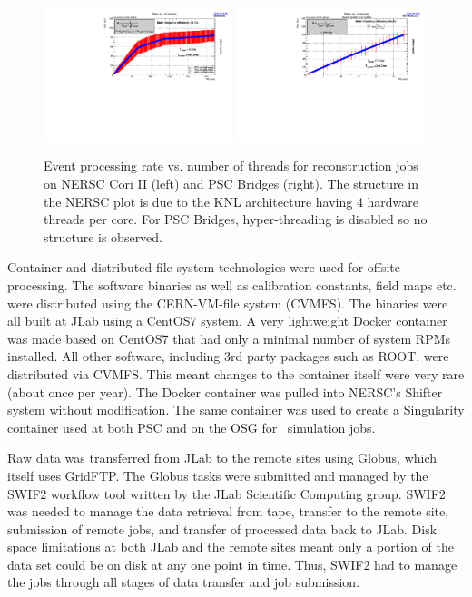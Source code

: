 \begin{figure}[h!]\centering
\includegraphics[width=0.49\textwidth]{figures/production_offsite_rate_vs_nthreads_NERSC.pdf}
\includegraphics[width=0.49\textwidth]{figures/production_offsite_rate_vs_nthreads_PSC.pdf}
\caption[]{\label{fig:production_offsite_rate_vs_nthreads_NERSC}Event processing rate vs. number of threads for reconstruction jobs on NERSC Cori II (left) and PSC Bridges (right). The structure in the NERSC plot is due to the KNL architecture having 4 hardware threads per core. For PSC Bridges, hyper-threading is disabled so no structure is observed.} 
\end{figure}

Container and distributed file system technologies were used for offsite processing. The software binaries as well as calibration constants, field maps etc. were distributed using the CERN-VM-file system (CVMFS). The binaries were all built at JLab using a CentOS7 system. A very lightweight Docker container was made based on CentOS7 that had only a minimal number of system RPMs installed. All other software, including 3rd party packages such as ROOT, were distributed via CVMFS. This meant changes to the container itself were very rare (about once per year). The Docker container was pulled into NERSC's Shifter system without modification. The same container was used to create a Singularity container used at both PSC and on the OSG for \GX~simulation jobs.

Raw data was transferred from JLab to the remote sites using Globus,  which itself uses GridFTP. The Globus tasks were submitted and managed by the SWIF2 workflow tool written by the JLab Scientific Computing group. SWIF2 was needed to manage the data retrieval from tape, transfer to the remote site, submission of remote jobs, and transfer of processed data back to JLab. Disk space limitations at both JLab and the remote sites meant only a portion of the data set could be on disk at any one point in time. Thus, SWIF2 had to manage the jobs through all stages of data transfer and job submission.

